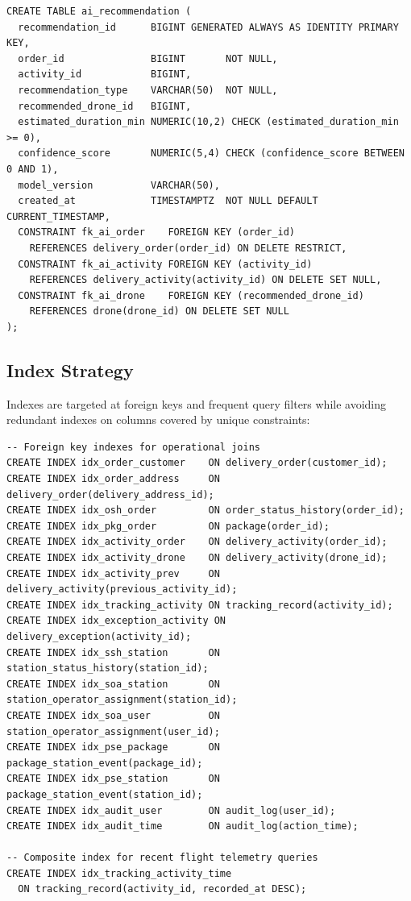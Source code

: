 \begin{verbatim}
CREATE TABLE ai_recommendation (
  recommendation_id      BIGINT GENERATED ALWAYS AS IDENTITY PRIMARY KEY,
  order_id               BIGINT       NOT NULL,
  activity_id            BIGINT,
  recommendation_type    VARCHAR(50)  NOT NULL,
  recommended_drone_id   BIGINT,
  estimated_duration_min NUMERIC(10,2) CHECK (estimated_duration_min >= 0),
  confidence_score       NUMERIC(5,4) CHECK (confidence_score BETWEEN 0 AND 1),
  model_version          VARCHAR(50),
  created_at             TIMESTAMPTZ  NOT NULL DEFAULT CURRENT_TIMESTAMP,
  CONSTRAINT fk_ai_order    FOREIGN KEY (order_id)
    REFERENCES delivery_order(order_id) ON DELETE RESTRICT,
  CONSTRAINT fk_ai_activity FOREIGN KEY (activity_id)
    REFERENCES delivery_activity(activity_id) ON DELETE SET NULL,
  CONSTRAINT fk_ai_drone    FOREIGN KEY (recommended_drone_id)
    REFERENCES drone(drone_id) ON DELETE SET NULL
);
\end{verbatim}

\subsection{Index Strategy}\label{s:indexes}

Indexes are targeted at foreign keys and frequent query filters while avoiding redundant indexes on columns covered by unique constraints:

\begin{verbatim}
-- Foreign key indexes for operational joins
CREATE INDEX idx_order_customer    ON delivery_order(customer_id);
CREATE INDEX idx_order_address     ON delivery_order(delivery_address_id);
CREATE INDEX idx_osh_order         ON order_status_history(order_id);
CREATE INDEX idx_pkg_order         ON package(order_id);
CREATE INDEX idx_activity_order    ON delivery_activity(order_id);
CREATE INDEX idx_activity_drone    ON delivery_activity(drone_id);
CREATE INDEX idx_activity_prev     ON delivery_activity(previous_activity_id);
CREATE INDEX idx_tracking_activity ON tracking_record(activity_id);
CREATE INDEX idx_exception_activity ON delivery_exception(activity_id);
CREATE INDEX idx_ssh_station       ON station_status_history(station_id);
CREATE INDEX idx_soa_station       ON station_operator_assignment(station_id);
CREATE INDEX idx_soa_user          ON station_operator_assignment(user_id);
CREATE INDEX idx_pse_package       ON package_station_event(package_id);
CREATE INDEX idx_pse_station       ON package_station_event(station_id);
CREATE INDEX idx_audit_user        ON audit_log(user_id);
CREATE INDEX idx_audit_time        ON audit_log(action_time);

-- Composite index for recent flight telemetry queries
CREATE INDEX idx_tracking_activity_time
  ON tracking_record(activity_id, recorded_at DESC);
\end{verbatim}

